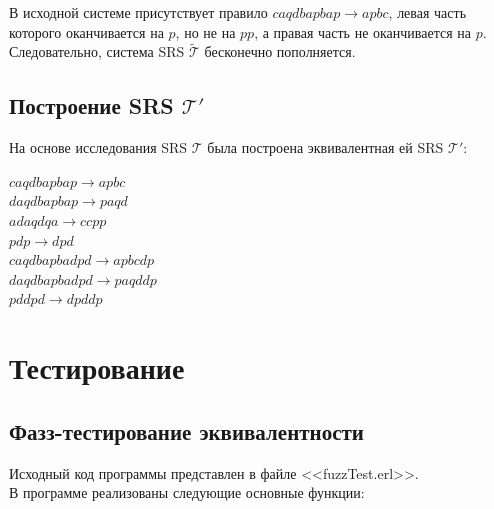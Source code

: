 \documentclass[a4paper,12pt]{article}
\newcommand{\T}{\mathcal{T}}
\begin{document}
В исходной системе присутствует правило $caqdbapbap \rightarrow apbc$, левая часть которого оканчивается на $p$, но не на $pp$, а правая часть не оканчивается на $p$. Следовательно, система SRS $\tilde{\T}$ бесконечно пополняется.


\subsection{Построение SRS $\mathcal{T}'$}

На основе исследования SRS $\mathcal{T}$ была построена эквивалентная ей SRS $\mathcal{T}'$:

\begin{flushleft} 
$caqdbapbap \rightarrow apbc$\\ 
$daqdbapbap \rightarrow paqd$\\ 
$adaqdqa \rightarrow ccpp$\\ 
$pdp \rightarrow dpd$ \\ 
$caqdbapbadpd \rightarrow apbcdp$ \\
$daqdbapbadpd \rightarrow paqddp$ \\
$pddpd \rightarrow dpddp$ \\
\end{flushleft}

\newpage
\section{Тестирование}

\subsection{Фазз-тестирование эквивалентности}

Исходный код программы представлен в файле <<fuzzTest.erl>>. \\ 

В программе реализованы следующие основные функции:
\end{document}
